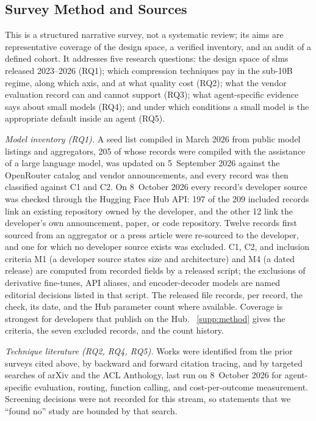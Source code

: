 \subsection{Survey Method and Sources}
\label{subsec:intro_method}

This is a structured narrative survey, not a systematic review; its aims are representative coverage of the design space, a verified inventory, and an audit of a defined cohort. It addresses five research questions: the design space of \glspl{slm} released 2023--2026 (RQ1); which compression techniques pay in the sub-10B regime, along which axis, and at what quality cost (RQ2); what the vendor evaluation record can and cannot support (RQ3); what agent-specific evidence says about small models (RQ4); and under which conditions a small model is the appropriate default inside an agent (RQ5).
\label{subsubsec:intro_rqs}
\label{subsubsec:intro_search}

\emph{Model inventory (RQ1).} A seed list compiled in March 2026 from public model listings and aggregators, 205 of whose records were compiled with the assistance of a large language model, was updated on 5~September 2026 against the OpenRouter catalog and vendor announcements, and every record was then classified against C1 and C2. On 8~October 2026 every record's developer source was checked through the Hugging Face Hub API: 197 of the 209 included records link an existing repository owned by the developer, and the other 12 link the developer's own announcement, paper, or code repository. Twelve records first sourced from an aggregator or a press article were re-sourced to the developer, and one for which no developer source exists was excluded. C1, C2, and inclusion criteria M1 (a developer source states size and architecture) and M4 (a dated release) are computed from recorded fields by a released script; the exclusions of derivative fine-tunes, API aliases, and encoder-decoder models are named editorial decisions listed in that script. The released file records, per record, the check, its date, and the Hub parameter count where available. Coverage is strongest for developers that publish on the Hub. \suppsec~\ref{supp:method} gives the criteria, the seven excluded records, and the count history.

\emph{Technique literature (RQ2, RQ4, RQ5).} Works were identified from the prior surveys cited above, by backward and forward citation tracing, and by targeted searches of arXiv and the ACL Anthology, last run on 8~October 2026 for agent-specific evaluation, routing, function calling, and cost-per-outcome measurement. Screening decisions were not recorded for this stream, so statements that we ``found no'' study are bounded by that search.

